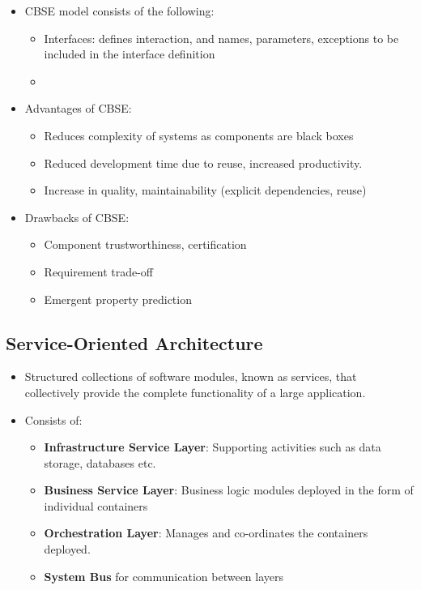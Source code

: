 \documentclass{article}
\begin{document}
\begin{itemize}
    
    \item CBSE model consists of the following:
    \begin{itemize}
        \item Interfaces: defines interaction, and names, parameters, exceptions to be included in the interface definition
        
        \item 
    \end{itemize}
    
    \item Advantages of CBSE:
    \begin{itemize}
        \item Reduces complexity of systems as components are black boxes
        
        \item Reduced development time due to reuse, increased productivity.
        
        \item Increase in quality, maintainability (explicit dependencies, reuse)
    \end{itemize}
    
    \item Drawbacks of CBSE:
    \begin{itemize}
        \item Component trustworthiness, certification
        
        \item Requirement trade-off
        
        \item Emergent property prediction
    \end{itemize}
\end{itemize}

\subsection{Service-Oriented Architecture}
\begin{itemize}
    \item Structured collections of software modules, known as services, that collectively provide the complete functionality of a large application. 
    
    \item Consists of:
    \begin{itemize}
        \item \textbf{Infrastructure Service Layer}: Supporting activities such as data storage, databases etc.
        
        \item \textbf{Business Service Layer}: Business logic modules deployed in the form of individual containers
        
        \item \textbf{Orchestration Layer}: Manages and co-ordinates the containers deployed.
        
        \item \textbf{System Bus} for communication between layers
    \end{itemize}
\end{itemize}
\end{document}
